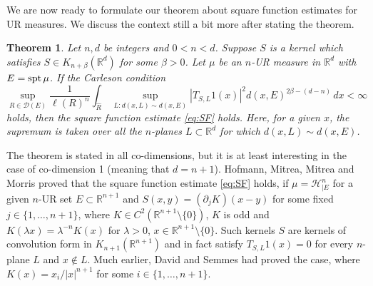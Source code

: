 \documentclass[11pt,a4paper,leqno]{amsart}
\newcommand{\R}{\mathbb{R}}
\numberwithin{equation}{section}
\theoremstyle{plain}
\newtheorem{thm}[equation]{Theorem}
\theoremstyle{definition}
\theoremstyle{remark}
\begin{document}
We are now ready to formulate our theorem about square function estimates for UR measures. We discuss the context still a bit more after stating the theorem.
\begin{thm}\label{thm:main}
Let $n, d$ be integers and $0 < n < d$. Suppose $S$ is a kernel which satisfies $S \in K_{n+\beta}(\R^d)$ for some $\beta > 0$.
Let $\mu$ be an $n$-UR measure in $\R^{d}$ with $E = \textup{spt}\,\mu$. If the Carleson condition
\begin{equation}\label{eq:modcar}
\sup_{R \in \mathcal{D}(E)} \frac{1}{\ell(R)^n} \int_{\widehat R}\,  \sup_{L\colon d(x,L) \sim d(x,E)} |T_{S,L}1(x)|^2 d(x, E)^{2\beta-(d-n)}\, dx < \infty
\end{equation}
holds, then the square function estimate \eqref{eq:SF} holds. Here, for a given $x$, the supremum is taken over all the $n$-planes $L \subset \R^d$ for which $d(x,L) \sim d(x,E)$.
\end{thm}
The theorem is stated in all co-dimensions, but it is at least interesting in
the case of co-dimension 1 (meaning that $d = n + 1$).
Hofmann, Mitrea, Mitrea and Morris \cite{HMMM} proved that the square function estimate \eqref{eq:SF} holds,
if $\mu = \mathcal{H}^n_{\mid E}$ for a given $n$-UR set $E \subset \R^{n+1}$ and
$S(x,y) = (\partial_j K)(x-y)$ for some fixed $j \in \{1,\ldots, n+1\}$, where
$K \in C^2(\R^{n+1} \setminus \{0\})$, $K$ is odd and $K(\lambda x) = \lambda^{-n} K(x)$ for $\lambda > 0$, $x \in \R^{n+1} \setminus \{0\}$.
Such kernels $S$
are kernels of convolution form in $K_{n+1}(\R^{n+1})$ and in fact satisfy $T_{S,L}1(x) = 0$ for every $n$-plane $L$ and $x \not \in L$.
Much earlier, David and Semmes \cite{DS} had proved the case, where $K(x) = x_i/|x|^{n+1}$ for some $i \in \{1,\ldots, n+1\}$. 
\end{document}
